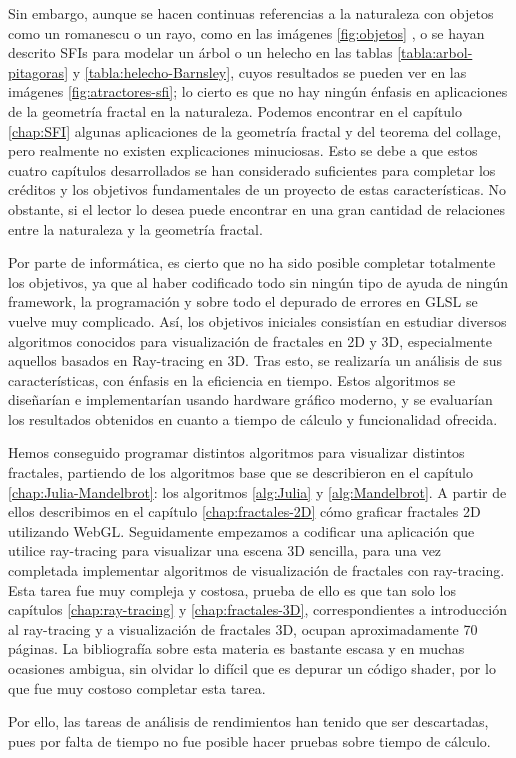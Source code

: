 Sin embargo, aunque se hacen continuas referencias a la naturaleza con objetos como un romanescu o un rayo, como en las imágenes \ref{fig:objetos} , o se hayan descrito SFIs para modelar un árbol o un helecho en las tablas \ref{tabla:arbol-pitagoras} y \ref{tabla:helecho-Barnsley}, cuyos resultados se pueden ver en las imágenes \ref{fig:atractores-sfi}; lo cierto es que no hay ningún énfasis en aplicaciones de la geometría fractal en la naturaleza. Podemos encontrar en el capítulo \ref{chap:SFI} algunas aplicaciones de la geometría fractal y del teorema del collage, pero realmente no existen explicaciones minuciosas. Esto se debe a que estos cuatro capítulos desarrollados se han considerado suficientes para completar los créditos y los objetivos fundamentales de un proyecto de estas características. No obstante, si el lector lo desea puede encontrar en \cite{alma991007242979704990} una gran cantidad de relaciones entre la naturaleza y la geometría fractal.

Por parte de informática, es cierto que no ha sido posible completar totalmente los objetivos, ya que al haber codificado todo sin ningún tipo de ayuda de ningún framework, la programación y sobre todo el depurado de errores en GLSL se vuelve muy complicado. Así, los objetivos iniciales consistían en estudiar diversos algoritmos conocidos para visualización de fractales en 2D y 3D, especialmente aquellos basados en Ray-tracing en 3D. Tras esto, se realizaría un análisis de sus características, con énfasis en la eficiencia en tiempo. Estos algoritmos se diseñarían e implementarían usando hardware gráfico moderno, y se evaluarían los resultados obtenidos en cuanto a tiempo de cálculo y funcionalidad ofrecida.

Hemos conseguido programar distintos algoritmos para visualizar distintos fractales, partiendo de los algoritmos base que se describieron en el capítulo \ref{chap:Julia-Mandelbrot}: los algoritmos \ref{alg:Julia} y \ref{alg:Mandelbrot}. A partir de ellos describimos en el capítulo \ref{chap:fractales-2D} cómo graficar fractales 2D utilizando WebGL. Seguidamente empezamos a codificar una aplicación que utilice ray-tracing para visualizar una escena 3D sencilla, para una vez completada implementar algoritmos de visualización de fractales con ray-tracing. Esta tarea fue muy compleja y costosa, prueba de ello es que tan solo los capítulos \ref{chap:ray-tracing} y \ref{chap:fractales-3D}, correspondientes a introducción al ray-tracing y a visualización de fractales 3D, ocupan aproximadamente 70 páginas. La bibliografía sobre esta materia es bastante escasa y en muchas ocasiones ambigua, sin olvidar lo difícil que es depurar un código shader, por lo que fue muy costoso completar esta tarea.

Por ello, las tareas de análisis de rendimientos han tenido que ser descartadas, pues por falta de tiempo no fue posible hacer pruebas sobre tiempo de cálculo.